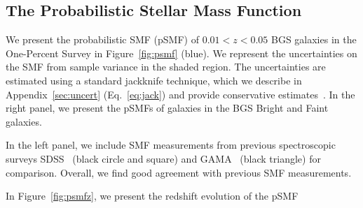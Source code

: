 \subsection{The Probabilistic Stellar Mass Function} \label{sec:psmf}
We present the probabilistic SMF (pSMF) of $0.01 < z < 0.05$ BGS galaxies in the
One-Percent Survey in Figure~\ref{fig:psmf} (blue). 
We represent the uncertainties on the SMF from sample variance in the shaded
region.
The uncertainties are estimated using a standard jackknife technique, which we
describe in Appendix~\ref{sec:uncert} (Eq.~\ref{eq:jack}) and provide
conservative estimates~\citep{norberg2009}. 
In the right panel, we present the pSMFs of galaxies in the BGS Bright and
Faint galaxies.  

In the left panel, we include SMF measurements from previous spectroscopic 
surveys SDSS~\citep{moustakas2013, bernard2017} (black circle and square) and
GAMA~\citep{driver2022} (black triangle) for comparison.
Overall, we find good agreement with previous SMF measurements. 

In Figure~\ref{fig:psmfz}, we present the redshift evolution of the pSMF 
